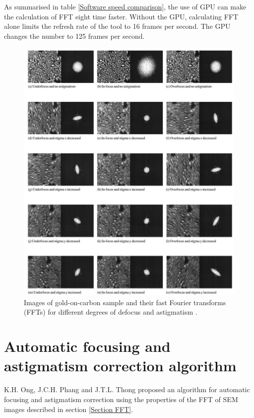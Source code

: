 \documentclass[12pt, conference]{IEEEtran}
\begin{document}
As summarised in table \ref{Software speed comparison}, the use of GPU can make the calculation of FFT eight time faster. Without the GPU, calculating FFT alone limits the refresh rate of the tool to 16 frames per second. The GPU changes the number to 125 frames per second.

\begin{figure}
    \centering
    \includegraphics[width=1\textwidth]{Images/SEM astigmatism.jpg}
    \caption{Images of gold-on-carbon sample and their fast Fourier transforms (FFTs) for different degrees of defocus and astigmatism \cite{SEM correction algorithm}.}
    \label{SEM astigmatism}
\end{figure}

\section{Automatic focusing and astigmatism correction algorithm}
\label{Section correction algorithm}
K.H. Ong, J.C.H. Phang and J.T.L. Thong proposed an algorithm for automatic focusing and astigmatism correction \cite{SEM correction algorithm} using the properties of the FFT of SEM images described in section \ref{Section FFT}.
\end{document}

